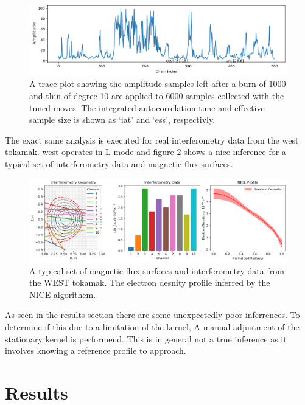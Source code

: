 \begin{figure}[H]
    \centering
    \includegraphics[width=400pt]{images/Final/TraceBurn1000_thin10.png}
    \caption{A trace plot showing the amplitude samples left after a burn of 1000 and thin of degree 10 are applied to 6000 samples collected with the tuned moves. The integrated autocorrelation time and effective sample size is shown as `iat' and `ess', respectivly.}
    \label{fig:tracethin}
\end{figure}

The exact same analysis is executed for real interferometry data from the \gls{west} tokamak. \gls{west} operates in L mode and figure \ref{fig:interf_nice} shows a \gls{nice} inference for a typical set of interferometry data and magnetic flux surfaces.

\begin{figure}[H]
    \centering
    \includegraphics[width=500pt]{images/Final/interferometry_nice.png}
    \caption{A typical set of magnetic flux surfaces and interferometry data from the WEST tokamak. The electron desnity profile inferred by the NICE algorithem.}
    \label{fig:interf_nice}
\end{figure}

As seen in the results section there are some unexpectedly poor inferrences. To determine if this due to a limitation of the kernel, A manual adjustment of the stationary kernel is performend. This is in general not a true inference as it involves knowing a reference profile to approach.

\section{Results}

